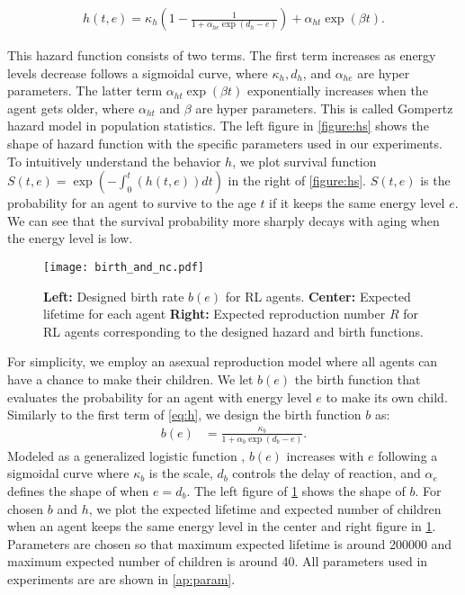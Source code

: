 \begin{align}
  h(t, e) = \kappa_{h} \left(1 - \frac{1}{1 + \alpha_{he} \exp(d_{h} - e)} \right) + \alpha_{ht} \exp(\beta t). \label{eq:h}
\end{align}

This hazard function\label{eq:h} consists of two terms. The first term increases as energy levels decrease follows a sigmoidal curve, where $\kappa_{h}, d_{h}$, and $\alpha_{he}$ are hyper parameters. The latter term $\alpha_{ht} \exp(\beta t)$ exponentially increases when the agent gets older, where $\alpha_{ht}$ and $\beta$ are hyper parameters. This is called Gompertz hazard model\citep{gompertzXXIVNatureFunction1825,kirkwoodDecipheringDeathCommentary2015} in population statistics. The left figure in \cref{figure:hs} shows the shape of hazard function with the specific parameters used in our experiments. To intuitively understand the behavior $h$, we plot survival function $S(t, e) = \exp (-\int_{0}^{t}(h(t, e)) dt)$ in the right of \cref{figure:hs}. $S(t, e)$ is the probability for an agent to survive to the age $t$ if it keeps the same energy level $e$. We can see that the survival probability more sharply decays with aging when the energy level is low.

\begin{figure}[t]
  \centering{}
  \texttt{[image: birth\_and\_nc.pdf]}
  \caption{
    \textbf{Left:} Designed birth rate $b(e)$ for RL agents.
    \textbf{Center:} Expected lifetime for each agent
    \textbf{Right:} Expected reproduction number $R$ for RL agents corresponding to the designed hazard and birth functions.
  }\label{figure:bnc}
\end{figure}

For simplicity, we employ an asexual reproduction model where all agents can have a chance to make their children. We let $b(e)$ the birth function that evaluates the probability for an agent with energy level $e$ to make its own child. Similarly to the first term of \cref{eq:h}, we design the birth function $b$ as:
\begin{align}
 b(e) &=  \frac{\kappa_{b}}{1 + \alpha_{b}\exp(d_{b} - e)}. \label{eq:b}
\end{align}
Modeled as a generalized logistic function \citep{richardsFlexibleGrowthFunction1959}, $b(e)$ increases with $e$ following a sigmoidal curve where $\kappa_{b}$ is the scale, $d_{b}$ controls the delay of reaction, and $\alpha_{e}$ defines the shape of when $e=d_{b}$. The left figure of \cref{figure:bnc} shows the shape of $b$. For chosen $b$ and $h$, we plot the expected lifetime and expected number of children when an agent keeps the same energy level in the center and right figure in \cref{figure:bnc}. Parameters are chosen so that maximum expected lifetime is around \num{200000} and maximum expected number of children is around 40. All parameters used in experiments are are shown in \cref{ap:param}.

